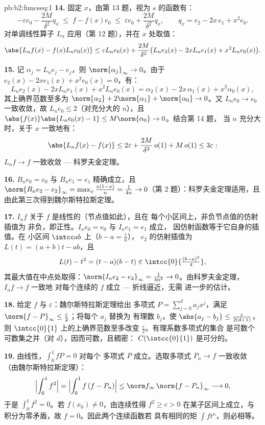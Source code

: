 \begin{solution}{pb:b2:funcseq:1}
\textbf{14.} 固定 $x$，由第 13 题，视为 $s$ 的函数有：
\[
-\varepsilon e_0 - \frac{2M}{\delta^2}q_x
\;\leq\; f - f(x)e_0
\;\leq\; \varepsilon e_0 + \frac{2M}{\delta^2}q_x,
\qquad q_x = e_2 - 2x\,e_1 + x^2e_0 .
\]
对单调线性算子 $L_n$ 应用（第 12 题），并在
$x$ 处取值：
\[
\abs{L_nf(x) - f(x)L_ne_0(x)}
\leq \varepsilon L_ne_0(x)
+ \frac{2M}{\delta^2}\bigl(L_ne_2(x) - 2xL_ne_1(x)
+ x^2L_ne_0(x)\bigr) .
\]

\textbf{15.} 记 $\alpha_j = L_ne_j - e_j$，则
$\norm{\alpha_j}_\infty \to 0$。由于 $e_2(x) - 2xe_1(x) +
x^2e_0(x) = 0$，有：
\[
L_ne_2(x) - 2xL_ne_1(x) + x^2L_ne_0(x)
= \alpha_2(x) - 2x\,\alpha_1(x) + x^2\alpha_0(x),
\]
其上确界范数至多为 $\norm{\alpha_2} + 2\norm{\alpha_1} +
\norm{\alpha_0} \to 0$。又 $L_ne_0 \to e_0$ 一致收敛，故
$L_ne_0 \leq 2$（对充分大的 $n$），且 $\abs{f(x)}\abs{L_ne_0(x) -
1} \leq M\norm{\alpha_0} \to 0$。结合第 14 题，
当 $n$ 充分大时，关于 $x$ 一致地有：
\[
\abs{L_nf(x) - f(x)} \leq 2\varepsilon +
\frac{2M}{\delta^2}\,o(1) + M\,o(1) \leq 3\varepsilon :
\]
$L_nf \to f$ 一致收敛 --- 科罗夫金定理。

\textbf{16.} $B_ne_0 = e_0$ 与 $B_ne_1 = e_1$ 精确成立，且
$\norm{B_ne_2 - e_2}_\infty = \max_x\frac{x(1-x)}{n} =
\frac{1}{4n} \to 0$（第 2 题）：科罗夫金定理适用，且
由此第三次得到魏尔斯特拉斯定理。

\textbf{17.} $I_nf$ 关于 $f$ 是线性的（节点值如此），且在
每个小区间上，非负节点值的仿射插值为
非负，即正性。$I_ne_0 = e_0$ 与 $I_ne_1 = e_1$ 成立，
因仿射函数等于它自身的插值。在
小区间 $\intcc ab$ 上（$b - a = \frac1n$），
$e_2$ 的仿射插值为 $L(t) = (a+b)t - ab$，且
\[
L(t) - t^2 = (t-a)(b-t) \in
\intcc{0}{\tfrac{(b-a)^2}{4}} ,
\]
其最大值在中点处取得：$\norm{I_ne_2 - e_2}_\infty =
\frac{1}{4n^2} \to 0$。由科罗夫金定理，$I_nf \to f$ 一致地
对每个连续的 $f$ 成立 --- 折线逼近，无需
进一步的估计。

\textbf{18.} 给定 $f$ 与 $\varepsilon$：魏尔斯特拉斯定理给出
多项式 $P = \sum_{j=0}^d a_jx^j$，满足 $\norm{f -
P}_\infty \leq \frac\varepsilon2$；将每个 $a_j$ 替换为
有理数 $b_j$，使 $\abs{a_j - b_j} \leq
\frac{\varepsilon}{2(d+1)}$，则
$\intcc{0}{1}$ 上的上确界范数至多改变 $\frac\varepsilon2$。有理系数多项式的集合
是可数个可数集之并（对
$d$），因而可数，且稠密：
$C(\intcc{0}{1})$ 是可分的。

\textbf{19.} 由线性，$\int_0^1 fP = 0$ 对每个
多项式 $P$ 成立。选取多项式 $P_n \to f$ 一致收敛
（由魏尔斯特拉斯定理）：
\[
\Bigl|\int_0^1 f^2\Bigr|
= \Bigl|\int_0^1 f\,(f - P_n)\Bigr|
\leq \norm f_\infty\,\norm{f - P_n}_\infty
\longrightarrow 0 ,
\]
于是 $\int_0^1 f^2 = 0$。若 $f(x_0) \neq 0$，由连续性得
$f^2 \geq c > 0$ 在某子区间上成立，与
积分为零矛盾，故 $f = 0$。因此两个连续函数若
具有相同的矩 $\int f t^n$，则必相等。


\end{solution}

